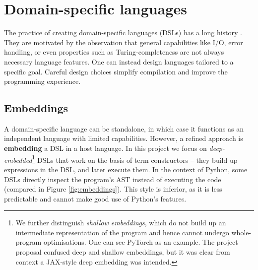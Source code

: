 


\section{Domain-specific languages}
\label{domain-specific-languages}

The practice of creating domain-specific languages (DSLs) has a long history \cite{hudak1996building}. They are motivated by the observation that general capabilities like I/O, error handling, or even properties such as Turing-completeness are not always necessary language features. One can instead design languages tailored to a specific goal. Careful design choices simplify compilation and improve the programming experience.

\subsection{Embeddings}

A domain-specific language can be standalone, in which case it functions as an independent language with limited capabilities. 
However, a refined approach is \textbf{embedding} a DSL in a host language. 
In this project we focus on \textit{deep-embedded}\footnote{We further distinguish \textit{shallow embeddings}, which do not build up an intermediate representation of the program \cite{gibbons2014folding} and hence cannot undergo whole-program optimisations. One can see PyTorch as an example. The project proposal confused deep and shallow embeddings, but it was clear from context a JAX-style deep embedding was intended.} DSLs that work on the basis of term constructors -- they build up expressions in the DSL, and later execute them. 
In the context of Python, some DSLs directly inspect the program's AST instead of executing the code (compared in Figure \ref{fig:embeddings}). 
This style is inferior, as it is less predictable and cannot make good use of Python's features. 

